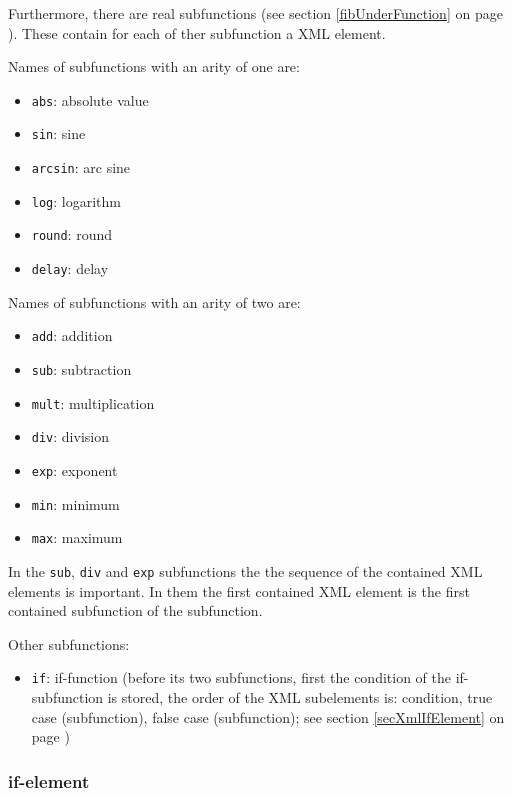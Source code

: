 \bigskip\noindent
Furthermore, there are real subfunctions (see section \ref{fibUnderFunction} on page \pageref{fibUnderFunction}). These contain for each of ther subfunction a XML element.

\bigskip\noindent
Names of subfunctions with an arity of one are:
\begin{itemize}
 \item \verb|abs|: absolute value
 \item \verb|sin|: sine
 \item \verb|arcsin|: arc sine
 \item \verb|log|: logarithm
 \item \verb|round|: round
 \item \verb|delay|: delay
\end{itemize}

\bigskip\noindent
Names of subfunctions with an arity of two are:
\begin{itemize}
 \item \verb|add|: addition
 \item \verb|sub|: subtraction
 \item \verb|mult|: multiplication
 \item \verb|div|: division
 \item \verb|exp|: exponent
 \item \verb|min|: minimum
 \item \verb|max|: maximum
\end{itemize}
In the \verb|sub|, \verb|div| and \verb|exp| subfunctions the the sequence of the contained XML elements is important. In them the first contained XML element is the first contained subfunction of the subfunction.

\bigskip\noindent
Other subfunctions:
\begin{itemize}
 \item \verb|if|: if-function (before its two subfunctions, first the condition of the if-subfunction is stored, the order of the XML subelements is: condition, true case (subfunction), false case (subfunction); see section \ref{secXmlIfElement} on page \pageref{secXmlIfElement})
\end{itemize}



\subsubsection{if-element}
\label{secXmlIfElement}

